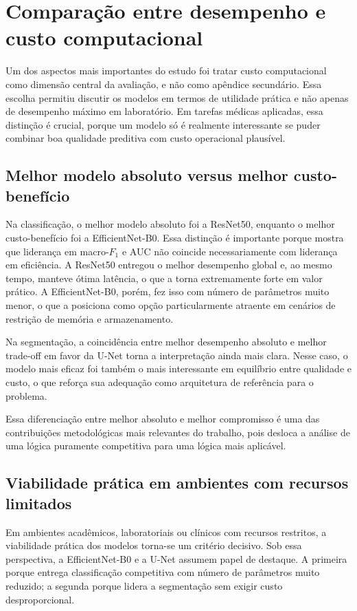 \documentclass[tcc,capa]{texufpel}
\begin{document}
\section{Comparação entre desempenho e custo computacional}

Um dos aspectos mais importantes do estudo foi tratar custo computacional como dimensão central da avaliação, e não como apêndice secundário. Essa escolha permitiu discutir os modelos em termos de utilidade prática e não apenas de desempenho máximo em laboratório. Em tarefas médicas aplicadas, essa distinção é crucial, porque um modelo só é realmente interessante se puder combinar boa qualidade preditiva com custo operacional plausível.

\subsection{Melhor modelo absoluto versus melhor custo-benefício}

Na classificação, o melhor modelo absoluto foi a ResNet50, enquanto o melhor custo-benefício foi a EfficientNet-B0. Essa distinção é importante porque mostra que liderança em macro-\(F_1\) e AUC não coincide necessariamente com liderança em eficiência. A ResNet50 entregou o melhor desempenho global e, ao mesmo tempo, manteve ótima latência, o que a torna extremamente forte em valor prático. A EfficientNet-B0, porém, fez isso com número de parâmetros muito menor, o que a posiciona como opção particularmente atraente em cenários de restrição de memória e armazenamento.

Na segmentação, a coincidência entre melhor desempenho absoluto e melhor trade-off em favor da U-Net torna a interpretação ainda mais clara. Nesse caso, o modelo mais eficaz foi também o mais interessante em equilíbrio entre qualidade e custo, o que reforça sua adequação como arquitetura de referência para o problema.

Essa diferenciação entre melhor absoluto e melhor compromisso é uma das contribuições metodológicas mais relevantes do trabalho, pois desloca a análise de uma lógica puramente competitiva para uma lógica mais aplicável.

\subsection{Viabilidade prática em ambientes com recursos limitados}

Em ambientes acadêmicos, laboratoriais ou clínicos com recursos restritos, a viabilidade prática dos modelos torna-se um critério decisivo. Sob essa perspectiva, a EfficientNet-B0 e a U-Net assumem papel de destaque. A primeira porque entrega classificação competitiva com número de parâmetros muito reduzido; a segunda porque lidera a segmentação sem exigir custo desproporcional.
\end{document}
